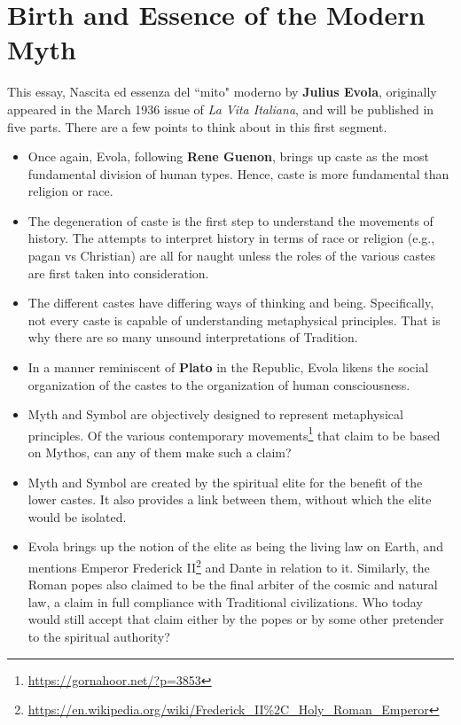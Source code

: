 \section{Birth and Essence of the Modern Myth}

\begin{quotex}
This essay, Nascita ed essenza del ``mito" moderno by \textbf{Julius Evola}, originally appeared in the March 1936 issue of \textit{La Vita Italiana}, and will be published in five parts. There are a few points to think about in this first segment.
\begin{itemize}
\item 
Once again, Evola, following \textbf{Rene Guenon}, brings up caste as the most fundamental division of human types. Hence, caste is more fundamental than religion or race. 

\item
The degeneration of caste is the first step to understand the movements of history. The attempts to interpret history in terms of race or religion (e.g., pagan vs Christian) are all for naught unless the roles of the various castes are first taken into consideration. 

\item
The different castes have differing ways of thinking and being. Specifically, not every caste is capable of understanding metaphysical principles. That is why there are so many unsound interpretations of Tradition. 

\item
In a manner reminiscent of \textbf{Plato} in the Republic, Evola likens the social organization of the castes to the organization of human consciousness. 

\item
Myth and Symbol are objectively designed to represent metaphysical principles. Of the various contemporary movements\footnote{\url{https://gornahoor.net/?p=3853}} that claim to be based on Mythos, can any of them make such a claim? 

\item
Myth and Symbol are created by the spiritual elite for the benefit of the lower castes. It also provides a link between them, without which the elite would be isolated. 

\item
Evola brings up the notion of the elite as being the living law on Earth, and mentions Emperor Frederick II\footnote{\url{https://en.wikipedia.org/wiki/Frederick_II\%2C_Holy_Roman_Emperor}} and Dante in relation to it. Similarly, the Roman popes also claimed to be the final arbiter of the cosmic and natural law, a claim in full compliance with Traditional civilizations. Who today would still accept that claim either by the popes or by some other pretender to the spiritual authority? 

\end{itemize}\end{quotex}
